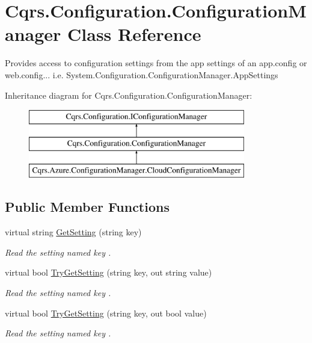 \hypertarget{classCqrs_1_1Configuration_1_1ConfigurationManager}{}\section{Cqrs.\+Configuration.\+Configuration\+Manager Class Reference}
\label{classCqrs_1_1Configuration_1_1ConfigurationManager}


Provides access to configuration settings from the app settings of an app.\+config or web.\+config... i.\+e. System.\+Configuration.\+Configuration\+Manager.\+App\+Settings  


Inheritance diagram for Cqrs.\+Configuration.\+Configuration\+Manager\+:\begin{figure}[H]
\begin{center}
\leavevmode
\includegraphics[height=3.000000cm]{classCqrs_1_1Configuration_1_1ConfigurationManager}
\end{center}
\end{figure}
\subsection*{Public Member Functions}
\begin{DoxyCompactItemize}
\item 
virtual string \hyperlink{classCqrs_1_1Configuration_1_1ConfigurationManager_ac3e31af665b95b781fee23f577170a63_ac3e31af665b95b781fee23f577170a63}{Get\+Setting} (string key)
\begin{DoxyCompactList}\small\item\em Read the setting named {\itshape key} . \end{DoxyCompactList}\item 
virtual bool \hyperlink{classCqrs_1_1Configuration_1_1ConfigurationManager_ad87af2a011af065d6d3e0d2ff01c7f6e_ad87af2a011af065d6d3e0d2ff01c7f6e}{Try\+Get\+Setting} (string key, out string value)
\begin{DoxyCompactList}\small\item\em Read the setting named {\itshape key} . \end{DoxyCompactList}\item 
virtual bool \hyperlink{classCqrs_1_1Configuration_1_1ConfigurationManager_a40810d0b9fd2f3d1c4a270681e908c84_a40810d0b9fd2f3d1c4a270681e908c84}{Try\+Get\+Setting} (string key, out bool value)
\begin{DoxyCompactList}\small\item\em Read the setting named {\itshape key} . \end{DoxyCompactList}\end{DoxyCompactItemize}


